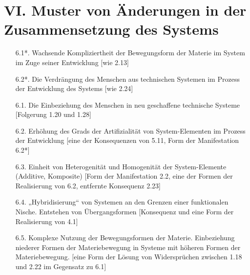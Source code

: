 \documentclass[11pt,a4paper]{article}
\begin{document}
\section*{VI. Muster von Änderungen in der Zusammensetzung des Systems}
\begin{itemize}
\item[6.1*.] Wachsende Kompliziertheit der Bewegungsform der Materie im System
  im Zuge seiner Entwicklung [wie 2.13]
\item[6.2*.] Die Verdrängung des Menschen aus technischen Systemen im Prozess
  der Entwicklung des Systems [wie 2.24]
\item[6.1.] Die Einbeziehung des Menschen in neu geschaffene technische
  Systeme [Folgerung 1.20 und 1.28]
\item[6.2.] Erhöhung des Grads der Artifizialität von System-Elementen im
  Prozess der Entwicklung [eine der Konsequenzen von 5.11, Form der
    Manifestation 6.2*]
\item[6.3.] Einheit von Heterogenität und Homogenität der System-Elemente
  (Additive, Komposite) [Form der Manifestation 2.2, eine der Formen der
  Realisierung von 6.2, entfernte Konsequenz 2.23]
\item[6.4.] „Hybridisierung“ von Systemen an den Grenzen einer funktionalen
  Nische.  Entstehen von Übergangsformen [Konsequenz und eine Form der
    Realisierung von 4.1]
\item[6.5.] Komplexe Nutzung der Bewegungsformen der Materie. Einbeziehung
  niederer Formen der Materiebewegung in Systeme mit höheren Formen der
  Materiebewegung.  [eine Form der Lösung von Widersprüchen zwischen 1.18 und
    2.22 im Gegensatz zu 6.1]
\end{itemize}
\end{document}
